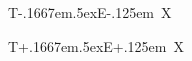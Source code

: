 \hbox{T\kern-.1667em\lower.5ex\hbox{E}\kern-.125em X}

\hbox{T\kern+.1667em\raise.5ex\hbox{E}\kern+.125em X}
